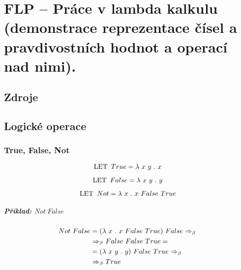 

\graphicspath{{flp/prace_v_lambda_kalkulu/figures}}


\chapter{FLP -- Práce v lambda kalkulu (demonstrace reprezentace čísel a pravdivostních hodnot a operací nad nimi).}


\section{Zdroje}

\begin{compactitem}
    \item {}
    \item {}
    \item {}
\end{compactitem}


\section{Logické operace}

\subsection{True, False, Not}

$$ \operatorname{\text{LET~}} True = \operatorname{\lambda\,} x ~ y \operatorname{\,.\,} x $$

$$ \operatorname{\text{LET~}} False = \operatorname{\lambda\,} x ~ y \operatorname{\,.\,} y $$

$$ \operatorname{\text{LET~}} Not = \operatorname{\lambda\,} x \operatorname{\,.\,} x ~ False ~ True $$

\paragraph*{Příklad: $Not ~ False$}
\begin{equation}
    \begin{split}
        Not ~ False &= (\operatorname{\lambda\,} x \operatorname{\,.\,} x ~ False ~ True) ~ False \operatorname{\,\Rightarrow_{\beta}\,} \\
        &\operatorname{\,\Rightarrow_{\beta}\,} False ~ False ~ True = \\
        &= (\operatorname{\lambda\,} x ~ y \operatorname{\,.\,} y) ~ False ~ True \operatorname{\,\Rightarrow_{\beta}\,} \\
        &\operatorname{\,\Rightarrow_{\beta}\,} True
    \end{split}
\end{equation}

